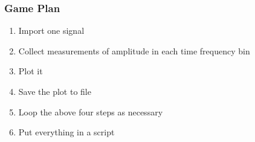 \documentclass{beamer}\usepackage[]{graphicx}\usepackage[]{color}
\begin{document}
\begin{frame}[fragile]
\frametitle{Game Plan}
\begin{enumerate}
		\item Import one signal

		\item Collect measurements of amplitude in each time frequency bin 

		\item Plot it

		\item Save the plot to file

		\item Loop the above four steps as necessary

		\item Put everything in a script
\end{enumerate}
\end{frame}
\end{document}
